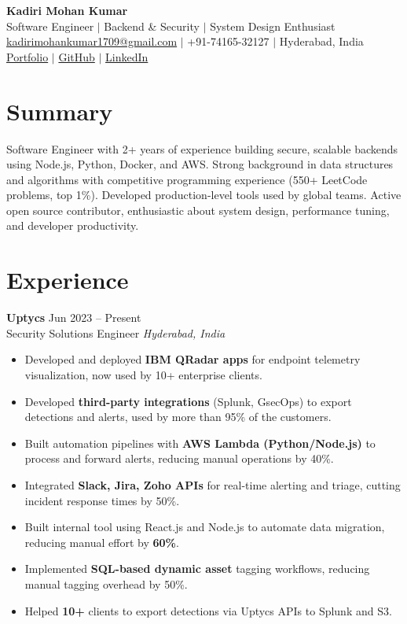 \documentclass[a4paper,10pt]{article}
\newcommand{\resumeItem}[1]{\item\small{#1}}
\newcommand{\resumeSubheading}[4]{
  \vspace{2pt}\textbf{#1} \hfill {#2}\\
  {\small#3} \hfill {\small\textit{#4}}\\[-4pt]
}
\begin{document}
\begin{center}
  {\LARGE\bfseries Kadiri Mohan Kumar}\\
  \vspace{3pt}
  \small
  Software Engineer $\vert$ Backend \& Security $\vert$ System Design Enthusiast\\
  \href{mailto:kadirimohankumar1709@gmail.com}{kadirimohankumar1709@gmail.com} $\vert$ +91-74165-32127 $\vert$ Hyderabad, India\\
  \href{https://mohankumarkadiri.vercel.app}{Portfolio} $\vert$ \href{https://github.com/mohankumarkadiri}{GitHub} $\vert$ \href{https://www.linkedin.com/in/mohankumarkadiri/}{LinkedIn}
\end{center}

\section*{Summary}
Software Engineer with 2+ years of experience building secure, scalable backends using Node.js, Python, Docker, and AWS. Strong background in data structures and algorithms with competitive programming experience (550+ LeetCode problems, top 1\%). Developed production-level tools used by global teams. Active open source contributor, enthusiastic about system design, performance tuning, and developer productivity.


\section*{Experience}
\resumeSubheading{Uptycs}{Jun 2023 -- Present}{Security Solutions Engineer}{Hyderabad, India}
\begin{itemize}[leftmargin=*,itemsep=2pt]
  \resumeItem{Developed and deployed \textbf{IBM QRadar apps} for endpoint telemetry visualization, now used by 10+ enterprise clients.}
  \resumeItem{Developed \textbf{third-party integrations} (Splunk, GsecOps) to export detections and alerts, used by more than 95\% of the customers.}
  \resumeItem{Built automation pipelines with \textbf{AWS Lambda (Python/Node.js)} to process and forward alerts, reducing manual operations by 40\%.}
  \resumeItem{Integrated \textbf{Slack, Jira, Zoho APIs} for real-time alerting and triage, cutting incident response times by 50\%.}
  \resumeItem{Built internal tool using React.js and Node.js to automate data migration, reducing manual effort by \textbf{60\%}.}
  \resumeItem{Implemented \textbf{SQL-based dynamic asset} tagging workflows, reducing manual tagging overhead by 50\%.}
  \resumeItem{Helped \textbf{10+} clients to export detections via Uptycs APIs to Splunk and S3.}
  
\end{itemize}
\end{document}
